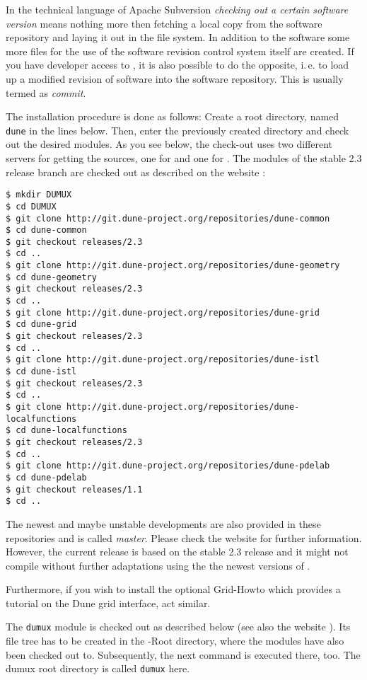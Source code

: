 In the technical language of Apache Subversion \emph{checking out a certain software version} means nothing more then fetching 
a local copy from the software repository and laying it out in the file system.
In addition to the software some more files for the use of the software revision
control system itself are created. If you have developer access to \Dumux, it is
also possible to do the opposite, i.\,e. to load up a modified revision of software
into the software repository. This is usually termed as \emph{commit}.

The installation procedure is done as follows:
Create a  {\Dune} root directory, named \texttt{dune} in the lines below.
Then, enter the previously created directory and check out the desired modules. 
As you see below, the check-out uses two different servers for getting the sources,
one for \Dune and one for {\Dumux}.
The \Dune modules of the stable 2.3 release branch are checked out as described
on the \Dune website \cite{DUNE-DOWNLOAD-GIT}:

\begin{lstlisting}[style=Bash]
$ mkdir DUMUX
$ cd DUMUX
$ git clone http://git.dune-project.org/repositories/dune-common
$ cd dune-common
$ git checkout releases/2.3
$ cd ..
$ git clone http://git.dune-project.org/repositories/dune-geometry
$ cd dune-geometry
$ git checkout releases/2.3
$ cd ..
$ git clone http://git.dune-project.org/repositories/dune-grid
$ cd dune-grid
$ git checkout releases/2.3
$ cd ..
$ git clone http://git.dune-project.org/repositories/dune-istl
$ cd dune-istl
$ git checkout releases/2.3
$ cd ..
$ git clone http://git.dune-project.org/repositories/dune-localfunctions
$ cd dune-localfunctions
$ git checkout releases/2.3
$ cd ..
$ git clone http://git.dune-project.org/repositories/dune-pdelab
$ cd dune-pdelab
$ git checkout releases/1.1
$ cd ..
\end{lstlisting}

The newest and maybe unstable developments are also provided in these repositories and is called \emph{master}.
Please check the \Dune website \cite{DUNE-DOWNLOAD-GIT} for further information. However, the current \Dumux release
is based on the stable 2.3 release and it might not compile without further adaptations using the the newest versions of \Dune.

Furthermore, if you wish to install the optional \Dune Grid-Howto which provides a tutorial
on the Dune grid interface, act similar.

The \texttt{dumux} module is checked out as described below (see also the \Dumux website \cite{DUMUX-HP}).
Its file tree has to be created in the \Dune-Root directory, where the \Dune modules have also been checked out to. Subsequently, the next command
is executed there, too. The dumux root directory is called \texttt{dumux} here.


